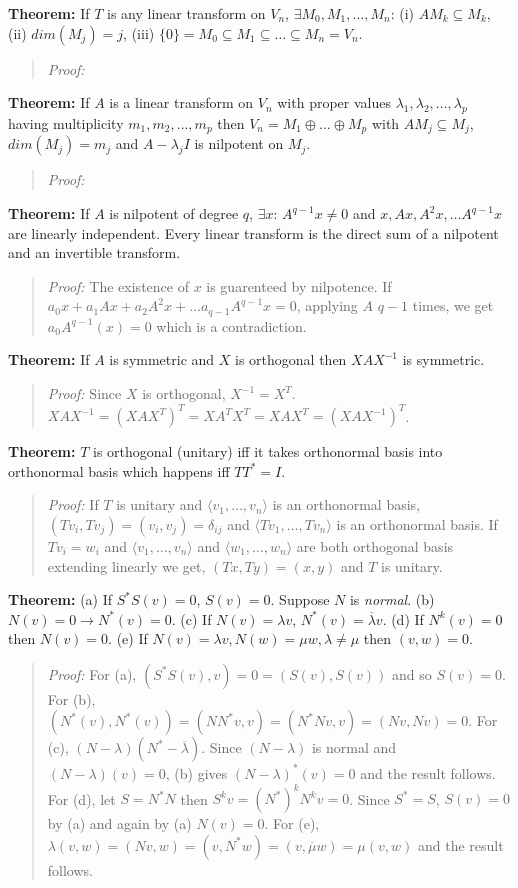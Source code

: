 {\bf Theorem:}
If $T$ is any linear transform on $V_n$, $\exists M_0 , M_1 , \ldots , M_n$:
(i) $AM_k \subseteq M_k$, (ii) $dim (M_j )= j$, (iii)
$\{0\} = M_0 \subseteq M_1 \subseteq \ldots \subseteq M_n= V_n$.
\begin{quote}
\emph{Proof:}
\end{quote}
{\bf Theorem:}
If $A$ is a linear transform on $V_n$ with proper values
$\lambda_1 , \lambda_2 ,  \ldots , \lambda_p$ having multiplicity
$m_1 , m_2 ,  \ldots , m_p$ then $V_n =  M_1 \oplus \ldots \oplus M_p$ with
$AM_j \subseteq M_j$, $dim(M_j ) = m_j$ and $A- \lambda_j I$
is nilpotent on $M_j$.
\begin{quote}
\emph{Proof:}
\end{quote}
{\bf Theorem:}
If $A$ is nilpotent of degree $q$, $\exists x$: $A^{q-1}x \ne 0$ and
$x , Ax , A^2 x, \ldots A^{q-1} x$ are linearly independent.  
Every linear transform is the direct sum of a nilpotent and an invertible transform.
\begin{quote}
\emph{Proof:} 
The existence of $x$ is guarenteed by nilpotence.
If $a_0 x +  a_1 Ax + a_2 A^2 x  + \ldots a_{q-1} A^{q-1} x = 0$, applying $A$
$q-1$ times, we get  $a_0 A^{q-1}(x)= 0$ which is a contradiction. 
\end{quote}
{\bf Theorem:}
If $A$ is symmetric and $X$ is orthogonal then $X A X^{-1}$ is symmetric.
\begin{quote}
\emph{Proof:}  Since $X$ is orthogonal, $X^{-1} = X^T$.
$X A X^{-1} = (X A X^T)^T = X A^T X^T = X A X^T = (X A X^{-1})^T$.
\end{quote}
{\bf Theorem:}
$T$ is orthogonal (unitary) iff it takes orthonormal basis into orthonormal basis
which happens iff $TT^*=I$.  
\begin{quote}
\emph{Proof:} 
If $T$ is unitary and $\langle v_1, \ldots , v_n \rangle$ is an orthonormal basis,
$(Tv_i, Tv_j)= (v_i, v_j)= \delta_{ij}$ and $\langle Tv_1 , \ldots , Tv_n \rangle$ is
an orthonormal basis.
If $T v_i = w_i$ and 
$\langle v_1 , \ldots , v_n \rangle$ and $\langle w_1 , \ldots , w_n \rangle$ 
are both orthogonal basis extending linearly we get, $(Tx, Ty)= (x,y)$ and $T$ is unitary.
\end{quote}
{\bf Theorem:}  (a) If $S^*S(v)=0$, $S(v)= 0$.
Suppose $N$ is \emph{normal}. 
(b) $N(v)= 0 \rightarrow N^*(v)= 0$.
(c) If $N(v)= \lambda v$, $N^*(v)= {\overline {\lambda}} v$. 
(d) If $N^k(v)=0$ then $N(v)=0$.
(e) If $N(v)= \lambda v, N(w)= \mu w, \lambda \ne \mu$ then $(v,w)= 0$.
\begin{quote}
\emph{Proof:} 
For (a), $(S^*S(v),v) = 0 = (S(v), S(v))$ and so $S(v)= 0$.
For (b), $(N^*(v), N^*(v))= (NN^*v,v)= (N^*Nv,v)=(Nv,Nv)=0$.
For (c), $(N-\lambda) (N^*-{\overline {\lambda}}) $.  Since 
$(N-\lambda)$ is normal and
$(N-\lambda)(v)= 0$, (b) gives
$(N-\lambda)^*(v)= 0$ and the result follows.
For (d), let $S=N^*N$ then $S^k v= (N^*)^k N^k v= 0$.  Since $S^*=S$, $S(v)= 0$ by
(a) and again by (a) $N(v)= 0$.
For (e), $\lambda (v,w)= (Nv,w)= (v, N^* w)= (v, {\overline {\mu}} w)= \mu (v,w)$ and
the result follows.
\end{quote}
